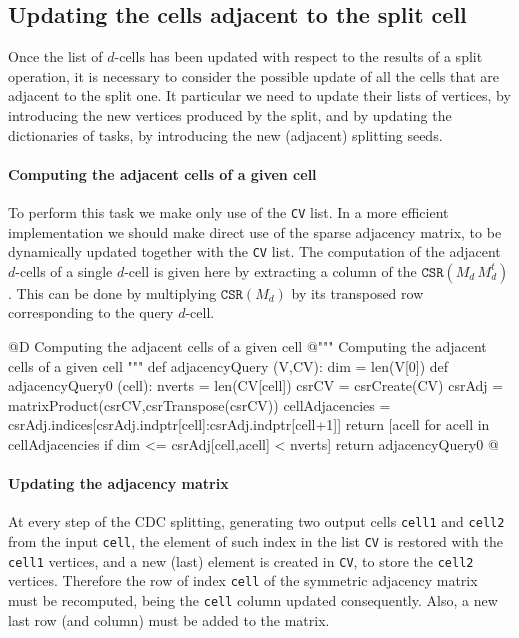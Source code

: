 \documentclass[11pt,oneside]{article}	%
\begin{document}
\subsection{Updating the cells adjacent to the split cell}

Once the list of $d$-cells has been updated with respect to the results of a split operation, it is necessary to consider the possible update of all the cells that are adjacent to the split one.  It particular we need to update their lists of vertices, by introducing the new vertices produced by the split, and by updating the dictionaries of tasks, by introducing the new (adjacent) splitting seeds.

\paragraph{Computing the adjacent cells of a given cell}
To perform this task we make only use of the \texttt{CV} list. In a more efficient implementation we should make direct use of the sparse adjacency matrix, to be dynamically updated together with the \texttt{CV} list.
The computation of the adjacent $d$-cells of a single $d$-cell is given here by extracting a column of the $\texttt{CSR}(M_d\, M_d^t)$. This can be done by multiplying $\texttt{CSR}(M_d)$ by its transposed row corresponding to the query $d$-cell. 

@D Computing the adjacent cells of a given cell
@{""" Computing the adjacent cells of a given cell """
def adjacencyQuery (V,CV):
	dim = len(V[0])
	def adjacencyQuery0 (cell):
		nverts = len(CV[cell])
		csrCV =  csrCreate(CV)
		csrAdj = matrixProduct(csrCV,csrTranspose(csrCV))
		cellAdjacencies = csrAdj.indices[csrAdj.indptr[cell]:csrAdj.indptr[cell+1]]
		return [acell for acell in cellAdjacencies if dim <= csrAdj[cell,acell] < nverts]
	return adjacencyQuery0
@}

\paragraph{Updating the adjacency matrix}
At every step of the CDC splitting, generating two output cells \texttt{cell1} and  \texttt{cell2} from the input  \texttt{cell}, the element of such index in the list \texttt{CV} is restored with the \texttt{cell1} vertices, and a new (last) element is created in \texttt{CV}, to store the \texttt{cell2} vertices.
Therefore the row of index \texttt{cell} of the symmetric  adjacency matrix must be recomputed, being the \texttt{cell} column updated consequently. Also, a new last row (and column) must be added to the matrix. 
\end{document}
